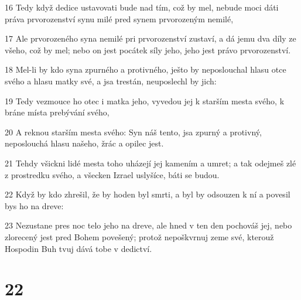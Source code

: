 \par 16 Tedy když dedice ustavovati bude nad tím, což by mel, nebude moci dáti práva prvorozenství synu milé pred synem prvorozeným nemilé,
\par 17 Ale prvorozeného syna nemilé pri prvorozenství zustaví, a dá jemu dva díly ze všeho, což by mel; nebo on jest pocátek síly jeho, jeho jest právo prvorozenství.
\par 18 Mel-li by kdo syna zpurného a protivného, ješto by neposlouchal hlasu otce svého a hlasu matky své, a jsa trestán, neuposlechl by jich:
\par 19 Tedy vezmouce ho otec i matka jeho, vyvedou jej k starším mesta svého, k bráne místa prebývání svého,
\par 20 A reknou starším mesta svého: Syn náš tento, jsa zpurný a protivný, neposlouchá hlasu našeho, žrác a opilec jest.
\par 21 Tehdy všickni lidé mesta toho uházejí jej kamením a umret; a tak odejmeš zlé z prostredku svého, a všecken Izrael uslyšíce, báti se budou.
\par 22 Když by kdo zhrešil, že by hoden byl smrti, a byl by odsouzen k ní a povesil bys ho na dreve:
\par 23 Nezustane pres noc telo jeho na dreve, ale hned v ten den pochováš jej, nebo zlorecený jest pred Bohem povešený; protož nepoškvrnuj zeme své, kterouž Hospodin Buh tvuj dává tobe v dedictví.

\chapter{22}

